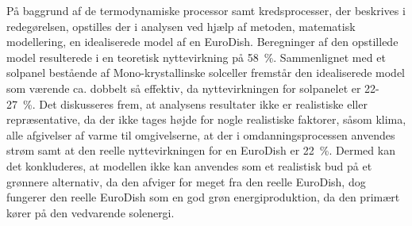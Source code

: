 \documentclass[SRC.tex]{subfiles}
\begin{document}
	På baggrund af de termodynamiske processor samt kredsprocesser, der beskrives i redegørelsen, opstilles der i analysen ved hjælp af metoden, matematisk modellering, en idealiserede model af en EuroDish. Beregninger af den opstillede model resulterede i en teoretisk nyttevirkning på  \SI{58}{\percent}. Sammenlignet med et solpanel bestående af Mono-krystallinske solceller fremstår den idealiserede model som værende ca. dobbelt så effektiv, da nyttevirkningen for solpanelet er 22-\SI{27}{\percent}. Det diskusseres frem, at analysens resultater ikke er realistiske eller repræsentative, da der ikke tages højde for nogle realistiske faktorer, såsom klima, alle afgivelser af varme til omgivelserne, at der i omdanningsprocessen anvendes strøm samt at den reelle nyttevirkningen for en EuroDish er \SI{22}{\percent}. Dermed kan det konkluderes, at modellen ikke kan anvendes som et realistisk bud på et grønnere alternativ, da den afviger for meget fra den reelle EuroDish, dog fungerer den reelle EuroDish som en god grøn energiproduktion, da den primært kører på den vedvarende solenergi. 
\end{document}
